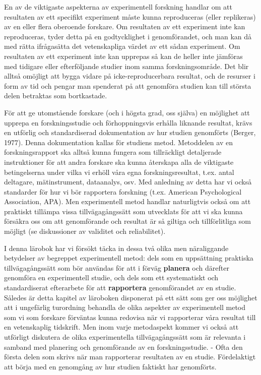 \documentclass[
]{book}
\begin{document}
En av de viktigaste aspekterna av experimentell forskning handlar om att resultaten av ett specifikt experiment måste kunna reproduceras (eller replikeras) av en eller flera oberoende forskare. Om resultaten av ett experiment inte kan reproduceras, tyder detta på en godtycklighet i genomförandet, och man kan då med rätta ifrågasätta det vetenskapliga värdet av ett sådan experiment. Om resultaten av ett experiment inte kan upprepas så kan de heller inte jämföras med tidigare eller efterföljande studier inom samma forskningsområde. Det blir alltså omöjligt att bygga vidare på icke-reproducerbara resultat, och de resurser i form av tid och pengar man spenderat på att genomföra studien kan till största delen betraktas som bortkastade.

För att ge utomstående forskare (och i högsta grad, oss själva) en möjlighet att upprepa en forskningsstudie och förhoppningsvis erhålla liknande resultat, krävs en utförlig och standardiserad dokumentation av hur studien genomförts (Berger, 1977). Denna dokumentation kallas för studiens metod. Metoddelen av en forskningsrapport ska alltså kunna fungera som tillräckligt detaljerade instruktioner för att andra forskare ska kunna återskapa alla de viktigaste betingelserna under vilka vi erhöll våra egna forskningsresultat, t.ex. antal deltagare, mätinstrument, dataanalys, osv. Med anledning av detta har vi också standarder för hur vi bör rapportera forskning (t.ex. American Psychological Association, APA). Men experimentell metod handlar naturligtvis också om att praktiskt tillämpa vissa tillvägagångssätt som utvecklats för att vi ska kunna försäkra oss om att genomförande och resultat är så giltiga och tillförlitliga som möjligt (se diskussioner av validitet och reliabilitet).

I denna lärobok har vi försökt täcka in dessa två olika men näraliggande betydelser av begreppet experimentell metod: dels som en uppsättning praktiska tillvägagångssätt som bör användas för att i förväg \textbf{planera} och därefter genomföra en experimentell studie, och dels som ett systematiskt och standardiserat efterarbete för att \textbf{rapportera} genomförandet av en studie. Således är detta kapitel av läroboken disponerat på ett sätt som ger oss möjlighet att i ungefärlig turordning behandla de olika aspekter av experimentell metod som vi som forskare förväntas kunna redovisa när vi rapporterar våra resultat till en vetenskaplig tidskrift. Men inom varje metodaspekt kommer vi också att utförligt diskutera de olika experimentella tillvägagångssätt som är relevanta i samband med planering och genomförande av en forskningsstudie. - Ofta den första delen som skrivs när man rapporterar resultaten av en studie. Fördelaktigt att börja med en genomgång av hur studien faktiskt har genomförts.
\end{document}
